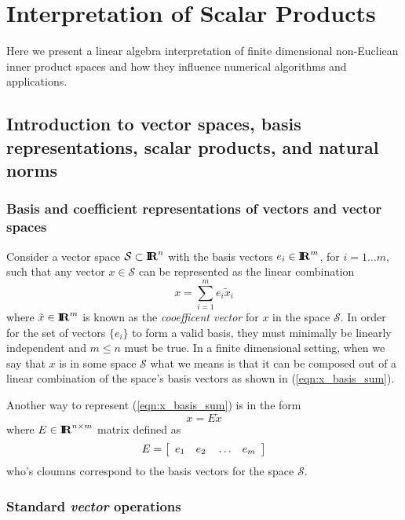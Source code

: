 \section{Interpretation of Scalar Products}

Here we present a linear algebra interpretation of finite dimensional
non-Eucliean inner product spaces and how they influence numerical algorithms
and applications.

\subsection{Introduction to vector spaces, basis representations, scalar products, and natural norms}

\subsubsection{Basis and coefficient representations of vectors and vector spaces}

Consider a vector space $\mathcal{S} {}\subset \RE^n$ with the basis vectors
$e_i\in\RE^m$, for $i=1\ldots{}m$, such that any vector $x\in\mathcal{S}$ can
be represented as the linear combination
%
\begin{equation}
x = \sum_{i=1}^{m} e_i \tilde{x}_i
\label{eqn:x_basis_sum}
\end{equation}
%
where $\tilde{x}\in\RE^m$ is known as the {}\textit{cooefficent vector} for
$x$ in the space $\mathcal{S}$.  In order for the set of vectors $\{e_i\}$ to
form a valid basis, they must minimally be linearly independent and $m {}\le
n$ must be true.  In a finite dimensional setting, when we say that $x$ is in
some space $\mathcal{S}$ what we means is that it can be composed out of a
linear combination of the space's basis vectors as shown in
(\ref{eqn:x_basis_sum}).

Another way to represent (\ref{eqn:x_basis_sum}) is in the form
%
\begin{equation}
x = E \tilde{x}
\label{eqn:x_basis_matrix}
\end{equation}
%
where $E\in\RE^{n\times{}m}$ matrix defined as
%
\begin{equation}
E = {\bmat{cccc} e_1 & e_2 & {}\ldots & e_m {}\emat}
\end{equation}
%
who's cloumns correspond to the basis vectors for the space $\mathcal{S}$.

\subsubsection{Standard {}\textit{vector} operations}

